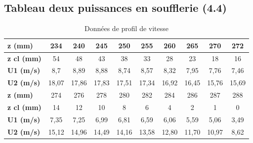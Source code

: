 \documentclass[12pt, a4paper]{report}
\begin{document}
	\subsection{Tableau deux puissances en soufflerie (4.4)}
	\vspace{-2em}
	\begin{table}[h]
		\centering
		\footnotesize %
		\begin{tabular}{l|ccccccccc}
			\toprule
			\textbf{z (mm)} & 234 & 240 & 245 & 250 & 255 & 260 & 265 & 270 & 272 \\
			\midrule
			\textbf{z cl (mm)} & 54 & 48 & 43 & 38 & 33 & 28 & 23 & 18 & 16 \\
			\textbf{U1 (m/s)} & 8,7 & 8,89 & 8,88 & 8,74 & 8,57 & 8,32 & 7,95 & 7,76 & 7,46 \\
			\textbf{U2 (m/s)} & 18,07 & 17,86 & 17,83 & 17,51 & 17,34 & 16,92 & 16,45 & 15,76 & 15,69 \\
			\toprule
			\textbf{z (mm)} & 274 & 276 & 278 & 280 & 282 & 284 & 286 & 287 & 288 \\
			\midrule
			\textbf{z cl (mm)} & 14 & 12 & 10 & 8 & 6 & 4 & 2 & 1 & 0 \\
			\textbf{U1 (m/s)} & 7,35 & 7,25 & 6,99 & 6,81 & 6,59 & 6,06 & 5,59 & 5,06 & 3,49 \\
			\textbf{U2 (m/s)} & 15,12 & 14,96 & 14,49 & 14,16 & 13,58 & 12,80 & 11,70 & 10,97 & 8,62 \\
			\bottomrule
		\end{tabular}
		\caption{Données de profil de vitesse}
	\end{table}
	
\end{document}
